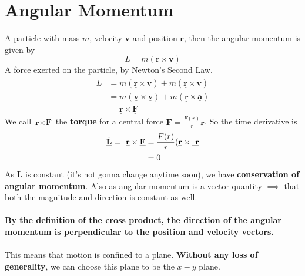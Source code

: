 \section{Angular Momentum}
A particle with mass \( m \), velocity \( \textbf{v} \) and position \(
\textbf{r} \), then the angular momentum is given by
\[ 
  L = m( \textbf{r} \times \textbf{v} )
\]
A force exerted on the particle, by Newton's Second Law.
\begin{align*}
  \underline{\dot{L}} &= m( \underline{\dot{\textbf{r}}} \times
  \underline{\textbf{v}}) + m( \underline{ \textbf{r}} \times \underline{ \dot{
  \textbf{v}}}) \\
  &= m ( \underline{ \textbf{v}} \times \underline{ \textbf{v}}) + m(
  \underline{ \textbf{r}} \times \underline{ \textbf{a}})\\
  &= \underline{ \textbf{r}} \times \underline{ \textbf{F}}
\end{align*}
We call \( \textbf{r} \times \textbf{F} \) the \textbf{torque} for a central
force \( \textbf{F} = \displaystyle \frac{F(r)}{r} \textbf{r} \). So the time
derivative is 
\begin{align*}
  \underline{ \dot{ \textbf{L}}} = \textbf{ \underline{r}} \times \underline{
  \textbf{F}} &= \frac{F(r)}{r} ( \underline{ \textbf{r}} \times \underline{
\textbf{ r}}\\
  &= 0
\end{align*}
As \( \textbf{L} \) is constant (it's not gonna change anytime soon), we have
\textbf{conservation of angular momentum}. Also as angular momentum is a vector
quantity \( \implies \) that both the magnitude and direction is constant as
well.
\\\\
\textbf{By the definition of the cross product, the direction of the angular
momentum is perpendicular to the position and velocity vectors.}
\\\\
This means that motion is confined to a plane. \textbf{Without any loss of
generality}, we can choose this plane to be the \( x-y \) plane.
